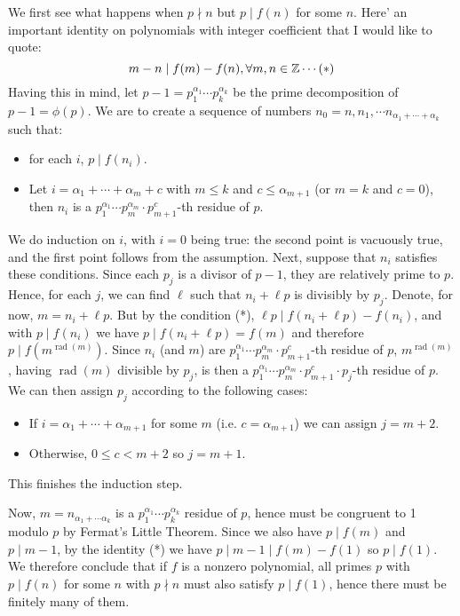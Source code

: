 \documentclass[11pt,a4paper]{article}
\begin{document}
\begin{enumerate}
	We first see what happens when $p\nmid n$ but $p\mid f(n)$ for some $n$. Here' an important identity on polynomials with integer coefficient that I would like to quote: 
	\[m-n\mid f(m)-f(n), \forall m, n\in\mathbb{Z}\cdots (*)
	\]
	Having this in mind, let $p-1=p_1^{\alpha_1}\cdots p_k^{\alpha_k}$ be the prime decomposition of $p-1=\phi(p)$. We are to create a sequence of numbers $n_0=n, n_1, \cdots n_{\alpha_1+\cdots + \alpha_k}$ such that: 
	\begin{itemize}
		\item for each $i$, $p\mid f(n_i)$. 
		\item Let $i=\alpha_1+\cdots + \alpha_m+c$ with $m\le k$ and $c\le\alpha_{m+1}$ (or $m=k$ and $c=0$), then $n_i$ is a $p_1^{\alpha_1}\cdots p_m^{\alpha_m}\cdot p_{m+1}^{c}$-th residue of $p$. 
	\end{itemize}
	We do induction on $i$, with $i=0$ being true: the second point is vacuously true, and the first point follows from the assumption. 
	Next, suppose that $n_i$ satisfies these conditions. Since each $p_j$ is a divisor of $p-1$, they are relatively prime to $p$. Hence, for each $j$, we can find $\ell$ such that $n_i+\ell p$ is divisibly by $p_j$. Denote, for now, $m=n_i+\ell p$. But by the condition (*), $\ell p\mid f(n_i+\ell p)-f(n_i)$, and with $p\mid f(n_i)$ we have $p\mid f(n_i +\ell p)=f(m)$ and therefore $p\mid f(m^{\operatorname{rad}(m)})$. 
	Since $n_i$ (and $m$) are $p_1^{\alpha_1}\cdots p_m^{\alpha_m}\cdot p_{m+1}^{c}$-th residue of $p$, $m^{\operatorname{rad}(m)}$, having $\operatorname{rad}(m)$ divisible by $p_j$, is then a $p_1^{\alpha_1}\cdots p_m^{\alpha_m}\cdot p_{m+1}^{c}\cdot p_j$-th residue of $p$. 
	We can then assign $p_j$ according to the following cases: 
	\begin{itemize}
		\item If $i=\alpha_1+\cdots + \alpha_{m+1}$ for some $m$ (i.e. $c=\alpha_{m+1}$) we can assign $j=m+2$. 
		
		\item Otherwise, $0\le c<m+2$ so $j=m+1$. 
	\end{itemize}
	This finishes the induction step. 
	
	Now, $m=n_{\alpha_1+\cdots \alpha_k}$ is a $p_1^{\alpha_1}\cdots p_k^{\alpha_k}$ residue of $p$, hence must be congruent to 1 modulo $p$ by Fermat's Little Theorem. 
	Since we also have $p\mid f(m)$ and $p\mid m-1$, by the identity (*) we have $p\mid m-1\mid f(m)-f(1)$ so $p\mid f(1)$. We therefore conclude that if $f$ is a nonzero polynomial, all primes $p$ with $p\mid f(n)$ for some $n$ with $p\nmid n$ must also satisfy $p\mid f(1)$, hence there must be finitely many of them. 
	

\end{enumerate}
\end{document}
